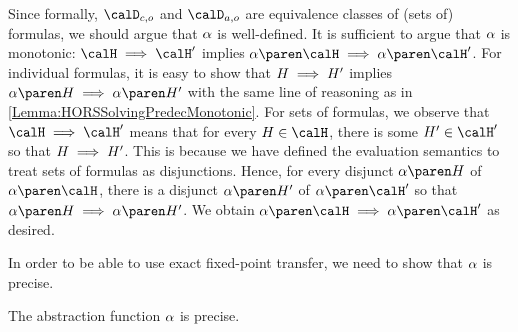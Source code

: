 \documentclass[../../diss.tex]{subfiles}
\begin{document}
Since formally, $\domainc{\ground}$ and $\domaina{\ground}$ are equivalence classes of (sets of) formulas, we should argue that $\abs$ is well-defined.
It is sufficient to argue that $\abs$ is monotonic: $\sof \lleq \sof'$ implies $\abs{\sof} \lleq \abs{\sof'}$.
For individual formulas, it is easy to show that $H \implies H'$ implies $\abs{H} \lleq \abs{H'}$ with the same line of reasoning as in \cref{Lemma:HORSSolvingPredecMonotonic}.
For sets of formulas, we observe that $\sof \lleq \sof'$ means that for every $H \in \sof$, there is some $H' \in \sof'$ so that $H \implies H'$.
This is because we have defined the evaluation semantics to treat sets of formulas as disjunctions.
Hence, for every disjunct $\abs{H}$ of $\abs{\sof}$, there is a disjunct $\abs{H'}$ of $\abs{\sof'}$ so that $\abs{H} \lleq \abs{H'}$.
We obtain $\abs{\sof} \lleq \abs{\sof'}$ as desired.

In order to be able to use exact fixed-point transfer, we need to show that $\abs$ is precise.


\begin{lemma}
    The abstraction function $\abs$ is precise.
\end{lemma}
\end{document}
